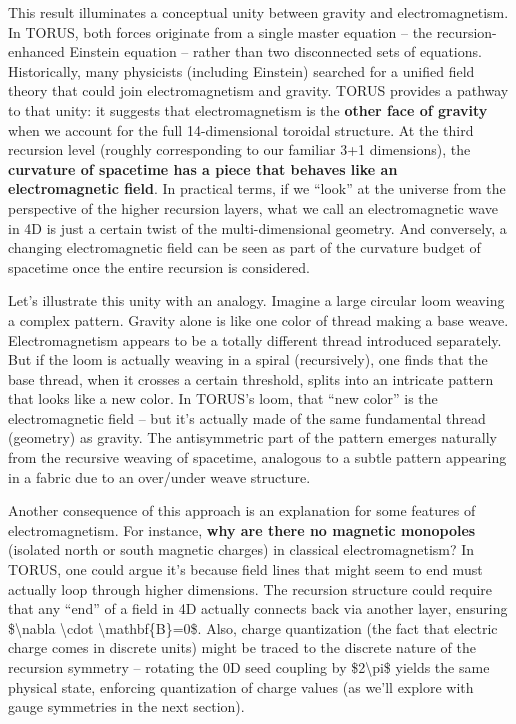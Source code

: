 This result illuminates a conceptual unity between gravity and
electromagnetism. In TORUS, both forces originate from a single master
equation -- the recursion-enhanced Einstein equation -- rather than two
disconnected sets of equations. Historically, many physicists (including
Einstein) searched for a unified field theory that could join
electromagnetism and gravity. TORUS provides a pathway to that unity: it
suggests that electromagnetism is the \textbf{other face of gravity}
when we account for the full 14-dimensional toroidal structure. At the
third recursion level (roughly corresponding to our familiar 3+1
dimensions), the \textbf{curvature of spacetime has a piece that behaves
like an electromagnetic field}​. In practical terms, if we ``look'' at
the universe from the perspective of the higher recursion layers, what
we call an electromagnetic wave in 4D is just a certain twist of the
multi-dimensional geometry. And conversely, a changing electromagnetic
field can be seen as part of the curvature budget of spacetime once the
entire recursion is considered.

Let's illustrate this unity with an analogy. Imagine a large circular
loom weaving a complex pattern. Gravity alone is like one color of
thread making a base weave. Electromagnetism appears to be a totally
different thread introduced separately. But if the loom is actually
weaving in a spiral (recursively), one finds that the base thread, when
it crosses a certain threshold, splits into an intricate pattern that
looks like a new color. In TORUS's loom, that ``new color'' is the
electromagnetic field -- but it's actually made of the same fundamental
thread (geometry) as gravity. The antisymmetric part of the pattern
emerges naturally from the recursive weaving of spacetime, analogous to
a subtle pattern appearing in a fabric due to an over/under weave
structure.

Another consequence of this approach is an explanation for some features
of electromagnetism. For instance, \textbf{why are there no magnetic
monopoles} (isolated north or south magnetic charges) in classical
electromagnetism? In TORUS, one could argue it's because field lines
that might seem to end must actually loop through higher dimensions. The
recursion structure could require that any ``end'' of a field in 4D
actually connects back via another layer, ensuring
\$\textbackslash{}nabla \textbackslash{}cdot
\textbackslash{}mathbf\{B\}=0\$​. Also, charge quantization (the fact
that electric charge comes in discrete units) might be traced to the
discrete nature of the recursion symmetry -- rotating the 0D seed
coupling by \$2\textbackslash{}pi\$ yields the same physical state,
enforcing quantization of charge values (as we'll explore with gauge
symmetries in the next section).

